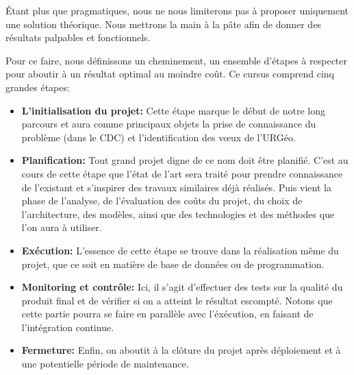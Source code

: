 \par
Étant plus que pragmatiques, nous ne nous limiterons pas à proposer 
uniquement une solution théorique. Nous mettrons la main à la pâte afin
de donner des résultats palpables et fonctionnels.
\par
Pour ce faire, nous définissons un cheminement, un ensemble d'étapes à 
respecter pour aboutir à un résultat optimal au moindre coût.
Ce cursus comprend cinq grandes étapes: 

\begin{itemize}
    \item \textbf{L'initialisation du projet: }
    Cette étape marque le début de notre long parcours et aura comme principaux
    objets la prise de connaissance du problème (dans le CDC) et l'identification des vœux de
    l'URGéo.
    \item \textbf{Planification: }
    Tout grand projet digne de ce nom doit être planifié. C'est au cours de cette étape
    que l'état de l'art sera traité pour prendre connaissance de l'existant et s'inspirer des travaux
    similaires déjà réalisés. Puis vient la phase de l'analyse, de l'évaluation des coûts du projet, 
    du choix  de l'architecture, des modèles,
    ainsi que des technologies et des méthodes que l'on aura à utiliser.
    \item \textbf{Exécution: }
    L'essence de cette étape se trouve dans la réalisation même du projet, que ce soit en matière de base de 
    données ou de programmation.
    \item \textbf{Monitoring et contrôle: }
    Ici, il s'agit d'effectuer des tests sur la qualité du produit final et de vérifier si on a atteint le 
    résultat escompté. Notons que cette partie pourra se faire en parallèle avec l'éxécution, en faisant de 
    l'intégration continue.
    \item \textbf{Fermeture: }
    Enfin, on aboutit à la clôture du projet après déploiement et à une potentielle période de maintenance.


\end{itemize}  